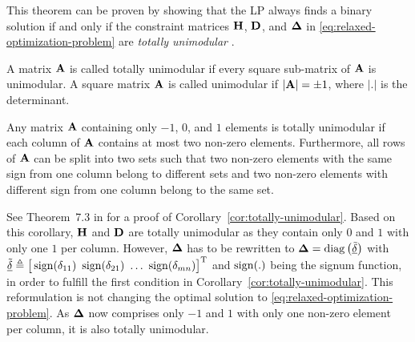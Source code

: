 \documentclass[journal, 10pt]{IEEEtran}
\begin{document}
This theorem can be proven by showing that the LP always finds a binary solution if and only if the constraint matrices ${{\mathbf{H}}}$, ${{\mathbf{D}}}$, and ${{\mathbf{\Delta}}}$ in \eqref{eq:relaxed-optimization-problem} are \emph{totally unimodular} \cite{Sierksma2001}.

%
%

\begin{Definition}
A matrix ${{\mathbf{A}}}$ is called totally unimodular if every square sub-matrix of ${{\mathbf{A}}}$ is unimodular. A square matrix ${{\mathbf{A}}}$ is called unimodular if $|{{\mathbf{A}}}| = \pm 1$, where $|.|$ is the determinant.
\end{Definition}


\begin{Corollary}
\label{cor:totally-unimodular}
Any matrix ${{\mathbf{A}}}$ containing only $-1$, $0$, and $1$ elements is totally unimodular if each column of ${{\mathbf{A}}}$ contains at most two non-zero elements. Furthermore, all rows of ${{\mathbf{A}}}$ can be split into two sets such that two non-zero elements with the same sign from one column belong to different sets and two non-zero elements with different sign from one column belong to the same set.
\end{Corollary}

See Theorem~7.3 in \cite{Sierksma2001} for a proof of Corollary~\ref{cor:totally-unimodular}. Based on this corollary, ${{\mathbf{H}}}$ and ${{\mathbf{D}}}$ are totally unimodular as they contain only $0$ and $1$ with only one $1$ per column. However, ${{\mathbf{\Delta}}}$ has to be rewritten to
${{\mathbf{\Delta}}} = \operatorname{diag}\big({\underline{\tilde \delta}}\big)$ with $\vec{\tilde \delta} \DEF \big[\sign(\delta_{11})\ \sign(\delta_{21})\ \ldots\ \sign(\delta_{mn})\big]\T$ and $\operatorname{sign}(.)$ being the signum function, in order to fulfill the first condition in Corollary~\ref{cor:totally-unimodular}. This reformulation is not changing the optimal solution to \eqref{eq:relaxed-optimization-problem}. As ${{\mathbf{\Delta}}}$ now comprises only $-1$ and $1$ with only one non-zero element per column, it is also totally unimodular.
\end{document}
